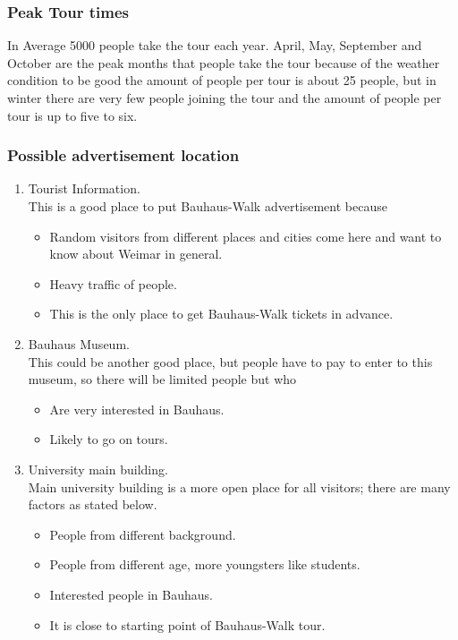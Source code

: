 \subsubsection{Peak Tour times}
In Average 5000 people take the tour each year. April, May, September and October are the peak months that people take the tour because of the weather condition to be good the amount of people per tour is about 25 people, but in winter there are very few people joining the tour and the amount of people per tour is up to five to six. 

\subsubsection{Possible advertisement location}

\begin {enumerate}

\item	Tourist Information. \\
This is a good place to put Bauhaus-Walk advertisement because 
\begin {itemize}
\item	Random visitors from different places and cities come here and want to know about Weimar in general. 
\item	Heavy traffic of people.
\item	This is the only place to get Bauhaus-Walk tickets in advance.
\end{itemize}


\item	Bauhaus Museum. \\
This could be another good place, but people have to pay to enter to this museum, so there will be limited people but who
\begin {itemize}
\item	Are very interested in Bauhaus.
\item	Likely to go on tours.
\end{itemize}


\item	University main building. \\
Main university building is a more open place for all visitors; there are many factors as stated below.

\begin {itemize}
\item	People from different background.	
\item	People from different age, more youngsters like students.
\item	Interested people in Bauhaus.
\item	It is close to starting point of Bauhaus-Walk tour.
\end{itemize}


\end{enumerate}



